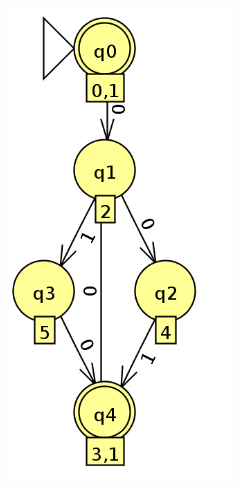 \documentclass[a4paper,12pt]{article}
\begin{document}
\includegraphics[width=6cm]{q10}
\end{document}
